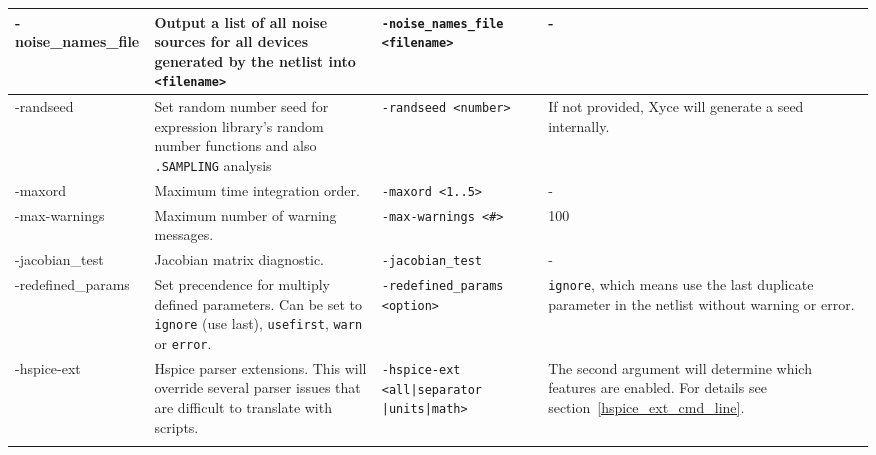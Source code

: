 \begin{longtable}[h] {>{\raggedright\small}m{1.1in}|>{\raggedright\small}m{2in}|>{\raggedright\small}m{1.5in}|>{\raggedright\let\\\tabularnewline\small}m{1in}}
-noise\_names\_file &
Output a list of all noise sources for all devices generated by the netlist
into \texttt{<filename>} &
\verb+-noise_names_file+
\verb+<filename>+ &
- \\ \hline

-randseed &
Set random number seed for expression library's random number functions and also \texttt{.SAMPLING} analysis &
\verb+-randseed <number>+ &
If not provided, Xyce will generate a seed internally. \\ \hline

-maxord &
Maximum time integration order. &
\verb+-maxord <1..5>+ &
- \\ \hline

-max-warnings &
Maximum number of warning messages. &
\verb+-max-warnings <#>+ &
100 \\ \hline

-jacobian\_test &
Jacobian matrix diagnostic. &
\verb+-jacobian_test+ &
-  \\ \hline

-redefined\_params & 
Set precendence for multiply defined parameters. Can be set to \texttt{ignore} (use last), \texttt{usefirst}, \texttt{warn} or \texttt{error}. &
\verb+-redefined_params+
\verb+<option>+ & \texttt{ignore}, which means use the last duplicate parameter in the netlist without warning or error.
  \\ \hline

-hspice-ext &
Hspice parser extensions.  This will override several parser issues that are difficult to translate with scripts. 

&
\verb+-hspice-ext+
\verb+<all|separator+
\verb+|units|math>+ & 
The second argument will determine which features are enabled.  
For details see section~\ref{hspice_ext_cmd_line}.
\\ \hline

\label{cmd_line_arg_list}
\end{longtable}


